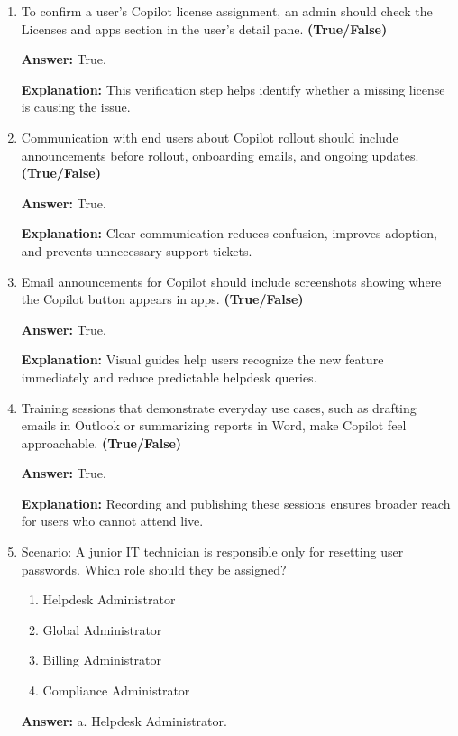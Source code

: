 \documentclass[10pt]{article}
\begin{document}
\begin{enumerate}[leftmargin=*]
\textbf{Answer:} True.

\textbf{Explanation:} This is one of the most common issues and can also occur due to outdated versions of Microsoft 365 Apps.

\item To confirm a user’s Copilot license assignment, an admin should check the Licenses and apps section in the user’s detail pane. \textbf{(True/False)}

\textbf{Answer:} True.

\textbf{Explanation:} This verification step helps identify whether a missing license is causing the issue.

\item Communication with end users about Copilot rollout should include announcements before rollout, onboarding emails, and ongoing updates. \textbf{(True/False)}

\textbf{Answer:} True.

\textbf{Explanation:} Clear communication reduces confusion, improves adoption, and prevents unnecessary support tickets.

\item Email announcements for Copilot should include screenshots showing where the Copilot button appears in apps. \textbf{(True/False)}

\textbf{Answer:} True.

\textbf{Explanation:} Visual guides help users recognize the new feature immediately and reduce predictable helpdesk queries.

\item Training sessions that demonstrate everyday use cases, such as drafting emails in Outlook or summarizing reports in Word, make Copilot feel approachable. \textbf{(True/False)}

\textbf{Answer:} True.

\textbf{Explanation:} Recording and publishing these sessions ensures broader reach for users who cannot attend live.

\item Scenario: A junior IT technician is responsible only for resetting user passwords. Which role should they be assigned?
\begin{enumerate}[label=\alph*., leftmargin=1.5em]
\item Helpdesk Administrator
\item Global Administrator
\item Billing Administrator
\item Compliance Administrator
\end{enumerate}
\textbf{Answer:} a. Helpdesk Administrator.


\end{enumerate}
\end{document}
